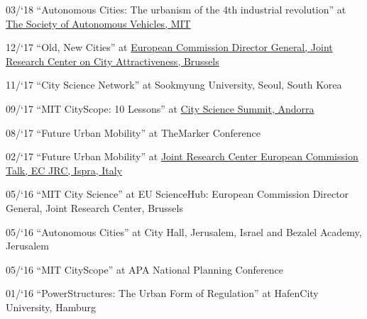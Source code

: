 \begin{tablist}
    \item[03/`18] \tab \enquote{Autonomous Cities: The urbanism of the 4th industrial revolution} at \href{http://cameraculture.media.mit.edu/category/blog/}{The Society of Autonomous Vehicles, MIT}

    \item[12/`17] \tab \enquote{Old, New Cities} at \href{https://www.youtube.com/watch?v=AW-ljDEleLw}{European Commission Director General, Joint Research Center on City Attractiveness, Brussels}

    \item[11/`17] \tab \enquote{City Science Network} at {Sookmyung University, Seoul, South Korea}

    \item[09/`17] \tab \enquote{MIT CityScope: 10 Lessons} at \href{https://www.youtube.com/watch?v=bRNbap13I5w}{City Science Summit, Andorra}


    \item[08/`17] \tab \enquote{Future Urban Mobility} at {TheMarker Conference}

    \item[02/`17] \tab \enquote{Future Urban Mobility} at \href{https://ec.europa.eu/jrc/en/event/conference/14th-jrc-annual-training-composite-indicators-and-scoreboards} {Joint Research Center European Commission Talk, EC JRC, Ispra, Italy}

    \item[05/`16] \tab \enquote{MIT City Science} at {EU ScienceHub:
        European Commission Director General, Joint Research Center, Brussels}

    \item[05/`16] \tab \enquote{Autonomous Cities} at {City Hall, Jerusalem, Israel and Bezalel Academy, Jerusalem}


    \item[05/`16] \tab \enquote{MIT CityScope} at {APA National Planning Conference}

    \item[01/`16] \tab \enquote{PowerStructures: The Urban Form of Regulation} at {HafenCity University, Hamburg}

\end{tablist}

